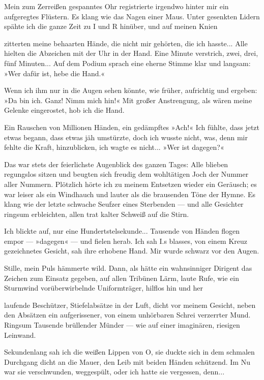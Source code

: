 Mein zum Zerreißen gespanntes Ohr registrierte irgendwo hinter mir
ein aufgeregtes Flüstern. Es klang wie das Nagen einer Maus. Unter
gesenkten Lidern spähte ich die ganze Zeit zu I und R hinüber, und
auf meinen Knien

zitterten meine behaarten Hände, die nicht mir gehörten, die ich
hasste... Alle hielten die Abzeichen mit der Uhr in der Hand. Eine
Minute verstrich, zwei, drei, fünf Minuten... Auf dem Podium sprach
eine eherne Stimme klar und langsam: »Wer dafür ist, hebe die
Hand.«

Wenn ich ihm nur in die Augen sehen könnte, wie früher, aufrichtig
und ergeben: »Da bin ich. Ganz! Nimm mich hin!« Mit großer
Anstrengung, als wären meine Gelenke eingerostet, hob ich die
Hand.

Ein Rauschen von Millionen Händen, ein gedämpftes »Ach!« Ich
fühlte, dass jetzt etwas begann, dass etwas jäh umstürzte, doch ich
wusste nicht, was, denn mir fehlte die Kraft, hinzublicken, ich
wagte es nicht... »Wer ist dagegen?«

Das war stets der feierlichste Augenblick des ganzen Tages: Alle
blieben regungslos sitzen und beugten sich freudig dem wohltätigen
Joch der Nummer aller Nummern. Plötzlich hörte ich zu meinem
Entsetzen wieder ein Geräusch; es war leiser als ein Windhauch und
lauter als die brausenden Töne der Hymne. Es klang wie der letzte
schwache Seufzer eines Sterbenden — und alle Gesichter ringsum
erbleichten, allen trat kalter Schweiß auf die Stirn.

Ich blickte auf, nur eine Hundertstelsekunde... Tausende von Händen
flogen empor — »dagegen« — und fielen herab. Ich sah I.s blasses,
von einem Kreuz gezeichnetes Gesicht, sah ihre erhobene Hand. Mir
wurde schwarz vor den Augen.

Stille, mein Puls hämmerte wild. Dann, als hätte ein wahnsinniger
Dirigent das Zeichen zum Einsatz gegeben, auf allen Tribünen Lärm,
laute Rufe, wie ein Sturmwind vorüberwirbelnde Uniformträger,
hilflos hin und her

laufende Beschützer, Stiefelabsätze in der Luft, dicht vor meinem
Gesicht, neben den Absätzen ein aufgerissener, von einem unhörbaren
Schrei verzerrter Mund. Ringsum Tausende brüllender Münder — wie
auf einer imaginären, riesigen Leinwand.

Sekundenlang sah ich die weißen Lippen von O, sie duckte sich in
dem schmalen Durchgang dicht an die Mauer, den Leib mit beiden
Händen schützend. Im Nu war sie verschwunden, weggespült, oder ich
hatte sie vergessen, denn...

